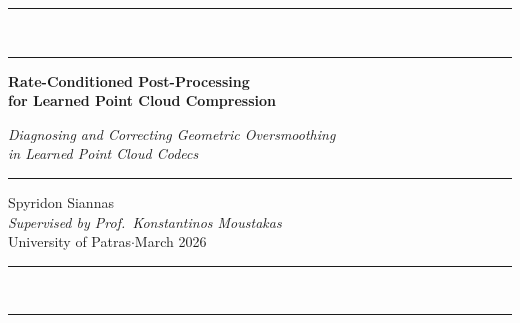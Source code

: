 \begin{titlepage}
\thispagestyle{empty}
\centering

\vspace*{2.2cm}

{\color{blue!30!black}\rule{\textwidth}{2.2pt}}\\[2.5pt]
{\color{blue!30!black}\rule{\textwidth}{0.5pt}}

\vspace{1.8cm}

{\fontsize{24}{31}\selectfont\bfseries
  Rate-Conditioned Post-Processing\\[0.45em]
  for Learned Point Cloud Compression%
}

\vspace{0.95em}

{\large\itshape\color{gray!55!black}
  Diagnosing and Correcting Geometric Oversmoothing\\[0.2em]
  in Learned Point Cloud Codecs%
}

\vspace{3.5cm}

{\color{blue!30!black}\rule{8.5cm}{0.5pt}}

\vspace{0.75em}

{\Large Spyridon Siannas}\\[0.45em]
{\normalsize\itshape Supervised by Prof.\ Konstantinos Moustakas}\\[0.35em]
{\normalsize University of Patras\quad$\cdot$\quad March 2026}

\vfill

{\color{blue!30!black}\rule{\textwidth}{0.5pt}}\\[2.5pt]
{\color{blue!30!black}\rule{\textwidth}{2.2pt}}

\end{titlepage}

\cleardoublepage
